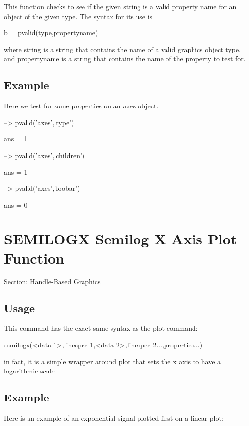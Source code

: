 This function checks to see if the given string is a valid property name for an object of the given type. The syntax for its use is \begin{DoxyVerb}  b = pvalid(type,propertyname)
\end{DoxyVerb}
 where {\ttfamily string} is a string that contains the name of a valid graphics object type, and {\ttfamily propertyname} is a string that contains the name of the property to test for. \hypertarget{variables_struct_Example}{}\subsection{Example}\label{variables_struct_Example}
Here we test for some properties on an {\ttfamily axes} object.


\begin{DoxyVerbInclude}
--> pvalid('axes','type')

ans = 
 1 

--> pvalid('axes','children')

ans = 
 1 

--> pvalid('axes','foobar')

ans = 
 0 
\end{DoxyVerbInclude}
 \hypertarget{handle_semilogx}{}\section{S\-E\-M\-I\-L\-O\-G\-X Semilog X Axis Plot Function}\label{handle_semilogx}
Section\-: \hyperlink{sec_handle}{Handle-\/\-Based Graphics} \hypertarget{vtkwidgets_vtkxyplotwidget_Usage}{}\subsection{Usage}\label{vtkwidgets_vtkxyplotwidget_Usage}
This command has the exact same syntax as the {\ttfamily plot} command\-: \begin{DoxyVerb}  semilogx(<data 1>,{linespec 1},<data 2>,{linespec 2}...,properties...)
\end{DoxyVerb}
 in fact, it is a simple wrapper around {\ttfamily plot} that sets the x axis to have a logarithmic scale. \hypertarget{variables_struct_Example}{}\subsection{Example}\label{variables_struct_Example}
Here is an example of an exponential signal plotted first on a linear plot\-:


